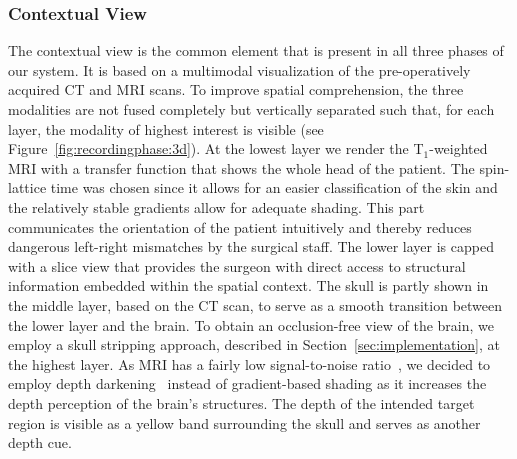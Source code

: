 \documentclass{vgtc}                          %
\begin{document}

\subsubsection{Contextual View}\label{sec:overview:planning:3d}
The contextual view is the common element that is present in all three phases of our system. %
It is based on a multimodal visualization of the pre-operatively acquired CT and MRI scans. To improve spatial comprehension, the three modalities are not fused completely but vertically separated such that, for each layer, the modality of highest interest is visible (see Figure~\ref{fig:recordingphase:3d}). At the lowest layer we render the T$_1$-weighted MRI with a transfer function that shows the whole head of the patient. The spin-lattice time was chosen since it allows for an easier classification of the skin and the relatively stable gradients allow for adequate shading. This part communicates the orientation of the patient intuitively and thereby reduces dangerous left-right mismatches by the surgical staff.
The lower layer is capped with a slice view that provides the surgeon with direct access to structural information embedded within the spatial context. The skull is partly shown in the middle layer, based on the CT scan, to serve as a smooth transition between the lower layer and the brain. To obtain an occlusion-free view of the brain, we employ a skull stripping approach, described in Section~\ref{sec:implementation}, at the highest layer. As MRI has a fairly low signal-to-noise ratio~\cite{Herrmann11}, we decided to employ depth darkening~\cite{Luft2005} instead of gradient-based shading as it increases the depth perception of the brain's structures. The depth of the intended target region is visible as a yellow band surrounding the skull and serves as another depth cue.
\end{document}
